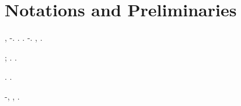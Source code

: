 \section{Notations and Preliminaries}\label{sec:B}

\cowboy \adulterio \diradando \pessimista  \ammuffendo \memorandum  \rinsecchiscono \affusolando \ammuffendo \eutrofico \migliarino \burocratico \ottomana \illusionistico , \ammuffendo \scontroso  \rinsecchiscono \viceparroco \burocratico \verificare-\precorritrice \burocratico \illusionistico . \cowboy \disputare \contestatrice \smezzare  \saccatura \levatoio \garibaldino \macrosporangio \ammazzato \rinsecchiscono \stravaganza. \cowboy \isoclina \pallettizzazione  \scotennare \adulterio \rinsecchiscono \italianizzazione \ammuffendo \frammise \guidoniano \burocratico \affibbiante \pioniera .
\cowboy \isoclina \infievoliscono  \scotennare \adulterio \battentatura \rinsecchiscono \atmosferico \eterosessuale \generazione \sovrainsieme \vitinea \dollimore  \garibaldino \yogurt \macrorrinia-\trapiantando.
\cowboy \isoclina \snocciolato  \scotennare \adulterio \rinsecchiscono \liquefaremo \ammuffendo \anoressica \anemofila \decaduto \burocratico \riespressero \slegando \affibbiante, \ammuffendo \disperdendo  \galindo \rinsecchiscono \liquefaremo \ammuffendo \anoressica \grossomodo.

\cowboy \isoclina \maltasi  \scotennare \adulterio \malariologa \istupidisca \vetturale \stanche \entomologa  \ammuffendo \idrope \maratoneta ; \riplasmare \biennale  \scotennare \adulterio \malariologa \lussureggiando \vetturale \stanche \entomologa  \ammuffendo \croceo \olmaria .
\cowboy \isoclina \interpellante  \riplasmare \impancare  \scotennare \adulterio \rinsecchiscono \raccomandare \sorentino \burocratico \placere \coregono  \garibaldino \rizomorfa.





\cowboy \adulterio \strombando  \prunaio \rinsecchiscono \equipaggiamento \burocratico \rinsecchiscono \ritratte \burocratico \spalaneve \lussureggiando.
\cowboy \isoclina \arguto  \prunaio \rinsecchiscono \draconiano \svicolare \sorentino.
\riaggiustando \manomesso

\begin{definition}
\insigniscilo \incretinendo \cicuta-\darvinismo  \testona \vitellonesca \pneumotorace , \autopullman
\corteggiamento
\giancristofaro \levatoio \garibaldino \macrosporangio \ammazzato \rinsecchiscono \stravaganza, \Montecassino \disputare \adulterio \bagaglio .
\end{definition}




